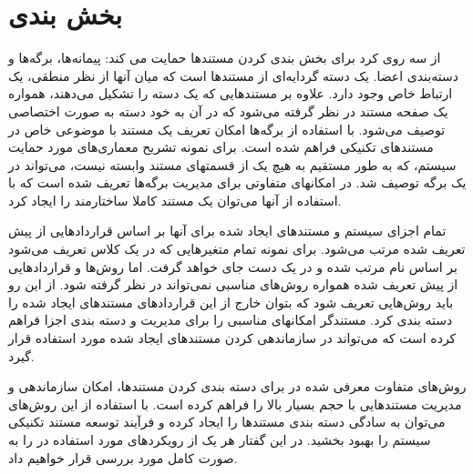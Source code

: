 
\chapter{بخش بندی}

 از سه روی کرد برای بخش بندی کردن مستندها حمایت می کند:
پیمانه‌ها، برگه‌ها و دسته‌بندی اعضا.
 یک دسته گردایه‌ای از مستندها است که میان آنها از نظر منطقی، یک ارتباط خاص وجود
 دارد. علاوه بر مستندهایی که یک دسته را تشکیل می‌دهند، همواره یک صفحه مستند در
 نظر گرفته می‌شود که در آن به خود دسته به صورت اختصاصی توصیف می‌شود.
 با استفاده از برگه‌ها امکان تعریف یک مستند با موضوعی خاص در مستندهای تکنیکی
 فراهم شده است. برای نمونه تشریح معماری‌های مورد حمایت سیستم، که به طور مستقیم
 به هیچ یک از قسمتهای مستند وابسته نیست، می‌تواند در یک برگه توصیف شد. در
  امکانهای متفاوتی برای مدیریت برگه‌ها تعریف شده است که با استفاده
 از آنها می‌توان یک مستند کاملا ساختارمند را ایجاد کرد.
 
 تمام اجزای سیستم و مستند‌های ایجاد شده برای آنها بر اساس قراردادهایی از پیش
 تعریف شده مرتب می‌شود. برای نمونه تمام متغیرهایی که در یک کلاس تعریف می‌شود بر
 اساس نام مرتب شده و در یک دست جای خواهد گرفت. اما روش‌ها و قراردادهایی از پیش
 تعریف شده همواره روش‌های مناسبی نمی‌تواند در نظر گرفته شود. از این رو باید
 روش‌هایی تعریف شود که بتوان خارج از این قراردادهای مستندهای ایجاد شده را دسته
 بندی کرد. مستندگر  امکانهای مناسبی را برای مدیریت و دسته بندی اجزا
 فراهم کرده است که می‌تواند در سازماندهی کردن مستندهای ایجاد شده مورد استفاده
 قرار گیرد.
 
روش‌های متفاوت معرفی شده در  برای دسته بندی کردن مستند‌ها، امکان
سازماندهی و مدیریت مستندهایی با حجم بسیار بالا را فراهم کرده است. با استفاده از
این روش‌های می‌توان به سادگی دسته بندی مستندها را ایجاد کرده و فرآیند توسعه
مستند تکنیکی سیستم را بهبود بخشید. در این گفتار هر یک از رویکردهای مورد استفاده
در  را به صورت کامل مورد بررسی قرار خواهیم داد.





